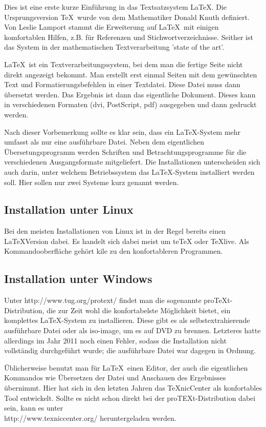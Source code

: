\documentclass[12pt,a4paper]{scrartcl}
\numberwithin{equation}{section}
\begin{document}
Dies ist eine erste kurze Einführung in das Textsatzsystem \LaTeX. 
Die Ursprungsversion \TeX\ wurde von dem Mathematiker Donald Knuth definiert.
Von Leslie Lamport stammt die Erweiterung auf \LaTeX\ mit einigen komfortablen Hilfen, z.B. für Referenzen und Stichwortverzeichnisse. Seither ist das System in der mathematischen Textverarbeitung 'state of the art'.

\LaTeX\ ist ein Textverarbeitungssystem, bei dem man die fertige Seite nicht direkt angezeigt bekommt. Man erstellt erst einmal Seiten mit dem gewünschten Text und Formatierungsbefehlen in einer Textdatei. Diese Datei muss dann übersetzt werden. Das Ergebnis ist dann das eigentliche Dokument. Dieses kann in verschiedenen Formaten (dvi, PostScript, pdf) ausgegeben und dann gedruckt werden. 

Nach dieser Vorbemerkung sollte es klar sein, dass ein \LaTeX-System mehr umfasst als nur eine ausführbare Datei. Neben dem eigentlichen Übersetungsprogramm werden Schriften und Betrachtungsprogramme für die verschiedenen Ausgangsformate mitgeliefert. Die Installationen unterscheiden sich auch darin, unter welchem Betriebssystem das \LaTeX-System installiert werden soll. Hier sollen nur zwei Systeme kurz genannt werden.

\subsection{Installation unter Linux}

Bei den meisten Installationen von Linux ist in der Regel bereits einen \LaTeX\-Version dabei. Es handelt sich dabei meist um teTeX oder TeXlive. Als Kommandooberfläche gehört kile zu den konfortableren Programmen.


\subsection{Installation unter Windows} 

Unter http://www.tug.org/protext/ findet man die sogenannte proTeXt-Distribution, die zur Zeit wohl die konfortabelste Möglichkeit bietet, ein komplettes \LaTeX-System zu installieren. Diese gibt es als selbstextrahierende ausführbare Datei oder als iso-image, um es auf DVD zu brennen. Letzteres hatte allerdings im Jahr 2011 noch einen Fehler, sodass die Installation nicht vollständig durchgeführt wurde; die ausführbare Datei war dagegen in Ordnung.

Üblicherweise benutzt man für \LaTeX\ einen Editor, der auch die eigentlichen Kommandos wie Übersetzen der Datei und Anschauen des Ergebnisses übernimmt. Hier hat sich in den letzten Jahren das TeXnicCenter als konfortables Tool entwickelt. Sollte es nicht schon direkt bei der proTEXt-Distribution dabei sein, kann es unter\\ http://www.texniccenter.org/ heruntergeladen werden.
 
\end{document}
